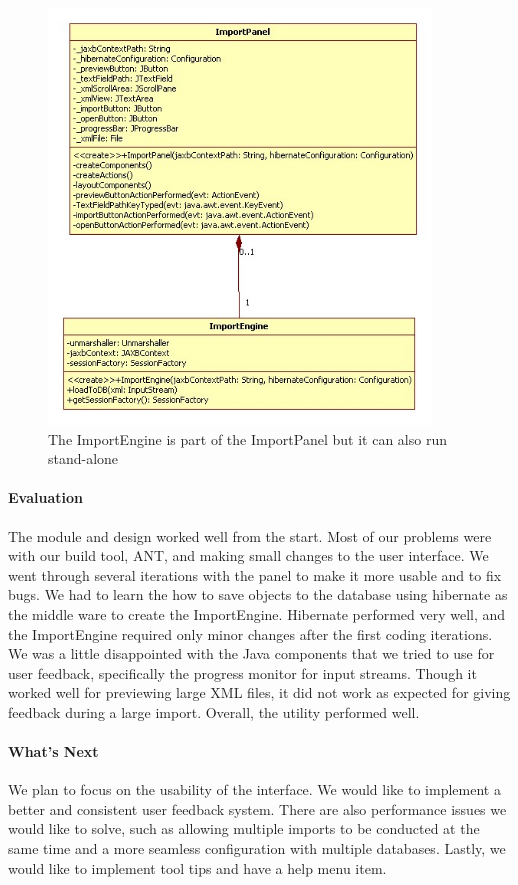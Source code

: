 \begin{figure}[h]
	\centering
		\includegraphics[width=4.00in]{Images/ImportClasses.jpg}
	\caption{The ImportEngine is part of the ImportPanel but it can also run stand-alone}
	\label{fig:ImportClasses}
\end{figure}

\paragraph{Evaluation}
The module and design worked well from the start. Most of our problems were with our build tool, ANT, and making small changes to the user interface. We went through several iterations with the panel to make it more usable and to fix bugs. We had to learn the how to save objects to the database using hibernate as the middle ware to create the ImportEngine. Hibernate performed very well, and the ImportEngine required only minor changes after the first coding iterations. We was a little disappointed with the Java components that we tried to use for user feedback, specifically the progress monitor for input streams. Though it worked well for previewing large XML files, it did not work as expected for giving feedback during a large import. Overall, the utility performed well. 

\paragraph{What's Next}
We plan to focus on the usability of the interface. We would like to implement a better and consistent user feedback system. There are also performance issues we would like to solve, such as allowing multiple imports to be conducted at the same time and a more seamless configuration with multiple databases. Lastly, we would like to implement tool tips and have a help menu item. 

